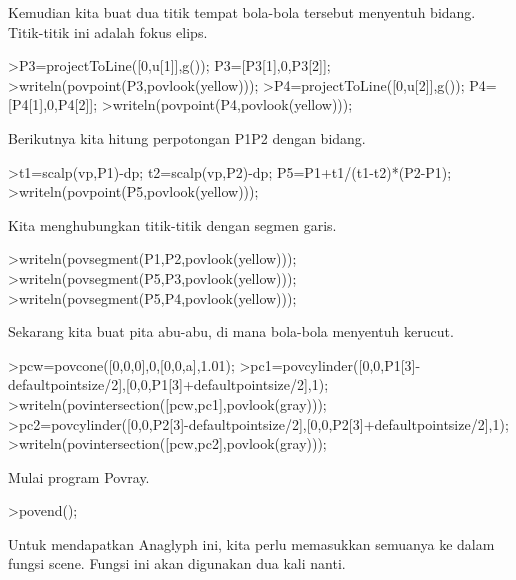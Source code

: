 \documentclass[a4paper,10pt]{article}
\begin{document}
\begin{eulernotebook}
\begin{eulercomment}
\begin{eulercomment}
\begin{eulercomment}
\begin{eulercomment}
\begin{eulercomment}
\begin{eulercomment}
\begin{eulercomment}
\begin{eulercomment}
\begin{eulercomment}
\begin{eulercomment}
\begin{eulercomment}
\begin{eulercomment}
\begin{eulercomment}
\begin{eulercomment}
\begin{eulercomment}
\begin{eulercomment}
\begin{eulercomment}
\begin{eulercomment}
\begin{eulerprompt}
\end{eulerprompt}
\begin{eulercomment}
Kemudian kita buat dua titik tempat bola-bola tersebut menyentuh
bidang. Titik-titik ini adalah fokus elips.
\end{eulercomment}
\begin{eulerprompt}
>P3=projectToLine([0,u[1]],g()); P3=[P3[1],0,P3[2]];
>writeln(povpoint(P3,povlook(yellow)));
>P4=projectToLine([0,u[2]],g()); P4=[P4[1],0,P4[2]];
>writeln(povpoint(P4,povlook(yellow)));
\end{eulerprompt}
\begin{eulercomment}
Berikutnya kita hitung perpotongan P1P2 dengan bidang.
\end{eulercomment}
\begin{eulerprompt}
>t1=scalp(vp,P1)-dp; t2=scalp(vp,P2)-dp; P5=P1+t1/(t1-t2)*(P2-P1);
>writeln(povpoint(P5,povlook(yellow)));
\end{eulerprompt}
\begin{eulercomment}
Kita menghubungkan titik-titik dengan segmen garis.
\end{eulercomment}
\begin{eulerprompt}
>writeln(povsegment(P1,P2,povlook(yellow)));
>writeln(povsegment(P5,P3,povlook(yellow)));
>writeln(povsegment(P5,P4,povlook(yellow)));
\end{eulerprompt}
\begin{eulercomment}
Sekarang kita buat pita abu-abu, di mana bola-bola menyentuh kerucut.
\end{eulercomment}
\begin{eulerprompt}
>pcw=povcone([0,0,0],0,[0,0,a],1.01);
>pc1=povcylinder([0,0,P1[3]-defaultpointsize/2],[0,0,P1[3]+defaultpointsize/2],1);
>writeln(povintersection([pcw,pc1],povlook(gray)));
>pc2=povcylinder([0,0,P2[3]-defaultpointsize/2],[0,0,P2[3]+defaultpointsize/2],1);
>writeln(povintersection([pcw,pc2],povlook(gray)));
\end{eulerprompt}
\begin{eulercomment}
Mulai program Povray.
\end{eulercomment}
\begin{eulerprompt}
>povend();
\end{eulerprompt}
\begin{eulercomment}
Untuk mendapatkan Anaglyph ini, kita perlu memasukkan semuanya ke
dalam fungsi scene. Fungsi ini akan digunakan dua kali nanti.
\end{eulercomment}

\end{eulercomment}
\end{eulercomment}
\end{eulercomment}
\end{eulercomment}
\end{eulercomment}
\end{eulercomment}
\end{eulercomment}
\end{eulercomment}
\end{eulercomment}
\end{eulercomment}
\end{eulercomment}
\end{eulercomment}
\end{eulercomment}
\end{eulercomment}
\end{eulercomment}
\end{eulercomment}
\end{eulercomment}
\end{eulercomment}
\end{eulernotebook}
\end{document}

